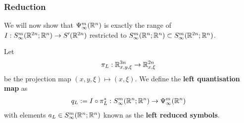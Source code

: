 \documentclass{article}
\begin{document}
\subsubsection{Reduction}
We will now show that $\Psi^{m}_\infty({\mathbb R}^n)$ is exactly the range of $I : S^{m}_\infty({\mathbb R}^{2n}; {\mathbb R}^n) \to S'({\mathbb R}^{2n})$ restricted to $S^{m}_\infty({\mathbb R}^{n}; {\mathbb R}^n) \subset S^{m}_\infty({\mathbb R}^{2n}; {\mathbb R}^n)$. 
\begin{fdefinition}
    Let 
    \begin{align*}
    \pi_L : {\mathbb R}^{3n}_{x, y, \xi} \to {\ensuremath {\mathbb R}}^{2n}_{x, \xi}
    \end{align*}
    be the projection map $(x, y, \xi) \mapsto (x, \xi)$. We define the \textbf{left quantisation map} as 
    \begin{align*}
    q_L := I \circ \pi_L^* : S^{m}_\infty({\mathbb R}^{n}; {\mathbb R}^n) \to \Psi^{m}_\infty({\mathbb R}^{n}) 
    \end{align*}
    with elements $a_L \in S^{m}_\infty({\mathbb R}^{n}; {\mathbb R}^n)$ known as the \textbf{left reduced symbols}.
    
\end{fdefinition}
\end{document}
